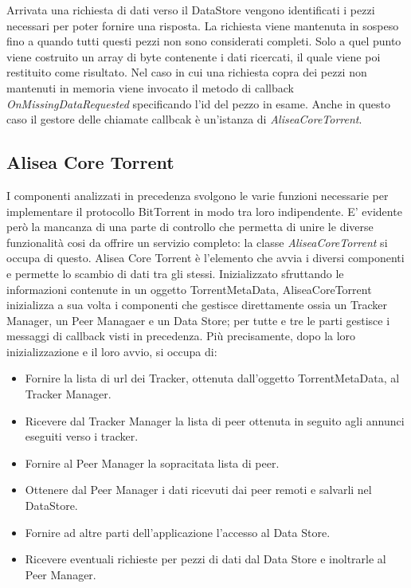 \documentclass[a4]{book}
\begin{document}
Arrivata una richiesta di dati verso il DataStore vengono identificati i pezzi necessari per poter fornire una risposta. La richiesta viene mantenuta in sospeso fino a quando tutti questi pezzi non sono considerati completi. Solo a quel punto viene costruito un array di byte contenente i dati ricercati, il quale viene poi restituito come risultato.\newline
Nel caso in cui una richiesta copra dei pezzi non mantenuti in memoria viene invocato il metodo di callback \textit{OnMissingDataRequested} specificando l'id del pezzo in esame.\newline\newline
Anche in questo caso il gestore delle chiamate callbcak è un'istanza di \textit{AliseaCoreTorrent}.\newline

\subsection{Alisea Core Torrent}
I componenti analizzati in precedenza svolgono le varie funzioni necessarie per implementare il protocollo BitTorrent in modo tra loro indipendente. E' evidente però la mancanza di una parte di controllo che permetta di unire le diverse funzionalità cosi da offrire un servizio completo: la classe \textit{AliseaCoreTorrent} si occupa di questo.\newline
Alisea Core Torrent è l'elemento che avvia i diversi componenti e permette lo scambio di dati tra gli stessi.\newline
Inizializzato sfruttando le informazioni contenute in un oggetto TorrentMetaData, AliseaCoreTorrent inizializza a sua volta i componenti che gestisce direttamente ossia un Tracker Manager, un Peer Managaer e un Data Store; per tutte e tre le parti gestisce i messaggi di callback visti in precedenza.\newline
Più precisamente, dopo la loro inizializzazione e il loro avvio, si occupa di:
\begin{itemize}
	\item Fornire la lista di url dei Tracker, ottenuta dall'oggetto TorrentMetaData, al Tracker Manager.
	\item Ricevere dal Tracker Manager la lista di peer ottenuta in seguito agli annunci eseguiti verso i tracker.
	\item Fornire al Peer Manager la sopracitata lista di peer.
	\item Ottenere dal Peer Manager i dati ricevuti dai peer remoti e salvarli nel DataStore.
	\item Fornire ad altre parti dell'applicazione l'accesso al Data Store.
	\item Ricevere eventuali richieste per pezzi di dati dal Data Store e inoltrarle al Peer Manager.
\end{itemize}
\newpage
\end{document}
